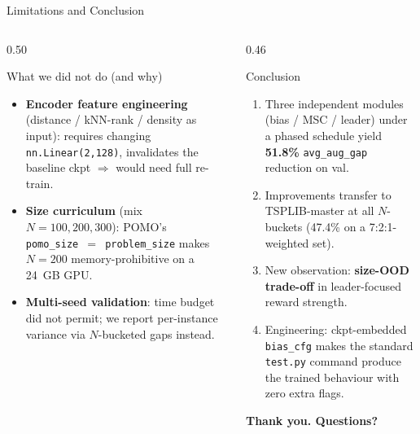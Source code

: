 \documentclass[aspectratio=169,11pt]{beamer}
\begin{document}
\begin{frame}{Limitations and Conclusion}
  \begin{columns}[T,totalwidth=\textwidth]
    \begin{column}{0.50\textwidth}
      \begin{block}{What we did not do (and why)}
        \footnotesize
        \begin{itemize}\setlength{\itemsep}{2pt}
          \item \textbf{Encoder feature engineering}
                (distance / kNN-rank / density as input):
                requires changing \texttt{nn.Linear(2,128)},
                invalidates the baseline ckpt $\Rightarrow$ would need full re-train.
          \item \textbf{Size curriculum} (mix $N \!=\! 100, 200, 300$):
                POMO's \texttt{pomo\_size\,$=$\,problem\_size}
                makes $N\!=\!200$ memory-prohibitive on a 24~GB GPU.
          \item \textbf{Multi-seed validation}: time budget did not permit;
                we report per-instance variance via $N$-bucketed gaps instead.
        \end{itemize}
      \end{block}
    \end{column}
    \begin{column}{0.46\textwidth}
      \begin{block}{Conclusion}
        \begin{enumerate}\setlength{\itemsep}{2pt}
          \item Three independent modules (bias / MSC / leader) under a phased schedule
                yield \textbf{51.8\%} \texttt{avg\_aug\_gap} reduction on val.
          \item Improvements transfer to TSPLIB-master at all $N$-buckets
                (47.4\% on a 7:2:1-weighted set).
          \item New observation: \textbf{size-OOD trade-off}
                in leader-focused reward strength.
          \item Engineering: ckpt-embedded \texttt{bias\_cfg}
                makes the standard \texttt{test.py} command produce
                the trained behaviour with zero extra flags.
        \end{enumerate}
      \end{block}
      \centering
      \vspace{0.2cm}
      {\large\color{sdmblue}\textbf{Thank you. Questions?}}
    \end{column}
  \end{columns}
\end{frame}
\end{document}
